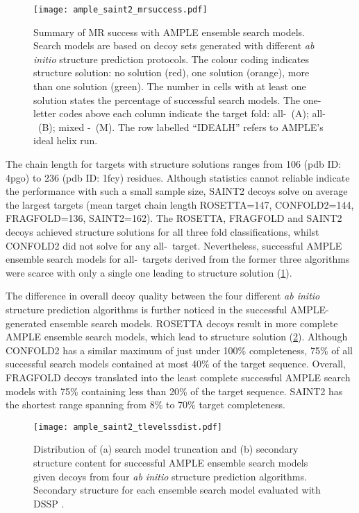 \begin{figure}[H]
    \centering
    \texttt{[image: ample\_saint2\_mrsuccess.pdf]}
    \caption[Summary of MR success with AMPLE ensemble search models]{Summary of MR success with AMPLE ensemble search models. Search models are based on decoy sets generated with different \textit{ab initio} structure prediction protocols. The colour coding indicates structure solution: no solution (red), one solution (orange), more than one solution (green). The number in cells with at least one solution states the percentage of successful search models. The one-letter codes above each column indicate the target fold: all-\textalpha\ (A); all-\textbeta\ (B); mixed \textalpha-\textbeta\ (M). The row labelled ``IDEALH'' refers to AMPLE's ideal helix run.}
    \label{fig:ample_saint2_mrsuccess}
\end{figure}

The chain length for targets with structure solutions ranges from 106 (\gls{pdb} ID: 4pgo) to 236 (\gls{pdb} ID: 1fcy) residues. Although statistics cannot reliable indicate the performance with such a small sample size, SAINT2 decoys solve on average the largest targets (mean target chain length ROSETTA=147, CONFOLD2=144, FRAGFOLD=136,  SAINT2=162). The ROSETTA, FRAGFOLD and SAINT2 decoys achieved structure solutions for all three fold classifications, whilst CONFOLD2 did not solve for any all-\textbeta\ target. Nevertheless, successful AMPLE ensemble search models for all-\textbeta\ targets derived from the former three algorithms were scarce with only a single one leading to structure solution (\cref{fig:ample_saint2_mrsuccess}).

The difference in overall decoy quality between the four different \textit{ab initio} structure prediction algorithms is further noticed in the successful AMPLE-generated ensemble search models. ROSETTA decoys result in more complete AMPLE ensemble search models, which lead to structure solution (\cref{fig:ample_saint2_tlevelssdist}). Although CONFOLD2 has a similar maximum of just under 100\% completeness, 75\% of all successful search models contained at most 40\% of the target sequence. Overall, FRAGFOLD decoys translated into the least complete successful AMPLE search models with 75\% containing less than 20\% of the target sequence. SAINT2 has the shortest range spanning from 8\% to 70\% target completeness.

\begin{figure}[H]
    \centering
    \texttt{[image: ample\_saint2\_tlevelssdist.pdf]}
    \caption[Distribution of search model truncation and secondary structure content]{Distribution of (a) search model truncation and (b) secondary structure content for successful AMPLE ensemble search models given decoys from four \textit{ab initio} structure prediction algorithms. Secondary structure for each ensemble search model evaluated with DSSP \cite{Frishman1995-si}.}
    \label{fig:ample_saint2_tlevelssdist}
\end{figure}

